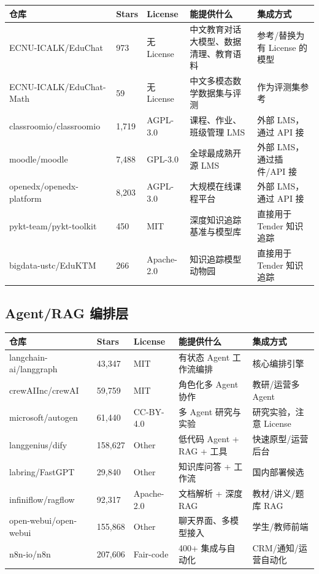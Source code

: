 \documentclass[UTF8,a4paper,11pt]{ctexart}
\begin{document}
\begin{center}
\begin{longtable}{@{}p{3.2cm}p{1.4cm}p{2.0cm}p{4.8cm}p{3.0cm}@{}}
\toprule
\textbf{仓库} & \textbf{Stars} & \textbf{License} & \textbf{能提供什么} & \textbf{集成方式} \\
\midrule
ECNU-ICALK/EduChat & 973 & 无 License & 中文教育对话大模型、数据清理、教育语料 & 参考/替换为有 License 的模型 \\
ECNU-ICALK/EduChat-Math & 59 & 无 License & 中文多模态数学数据集与评测 & 作为评测集参考 \\
classroomio/classroomio & 1{,}719 & AGPL-3.0 & 课程、作业、班级管理 LMS & 外部 LMS，通过 API 接 \\
moodle/moodle & 7{,}488 & GPL-3.0 & 全球最成熟开源 LMS & 外部 LMS，通过插件/API 接 \\
openedx/openedx-platform & 8{,}203 & AGPL-3.0 & 大规模在线课程平台 & 外部 LMS，通过 API 接 \\
pykt-team/pykt-toolkit & 450 & MIT & 深度知识追踪基准与模型库 & 直接用于 Tender 知识追踪 \\
bigdata-ustc/EduKTM & 266 & Apache-2.0 & 知识追踪模型动物园 & 直接用于 Tender 知识追踪 \\
\bottomrule
\end{longtable}
\end{center}

\subsection{Agent/RAG 编排层}

\begin{center}
\begin{longtable}{@{}p{3.2cm}p{1.6cm}p{2.2cm}p{4.4cm}p{3.0cm}@{}}
\toprule
\textbf{仓库} & \textbf{Stars} & \textbf{License} & \textbf{能提供什么} & \textbf{集成方式} \\
\midrule
langchain-ai/langgraph & 43{,}347 & MIT & 有状态 Agent 工作流编排 & 核心编排引擎 \\
crewAIInc/crewAI & 59{,}759 & MIT & 角色化多 Agent 协作 & 教研/运营多 Agent \\
microsoft/autogen & 61{,}440 & CC-BY-4.0 & 多 Agent 研究与实验 & 研究实验，注意 License \\
langgenius/dify & 158{,}627 & Other & 低代码 Agent + RAG + 工具 & 快速原型/运营后台 \\
labring/FastGPT & 29{,}840 & Other & 知识库问答 + 工作流 & 国内部署候选 \\
infiniflow/ragflow & 92{,}317 & Apache-2.0 & 文档解析 + 深度 RAG & 教材/讲义/题库 RAG \\
open-webui/open-webui & 155{,}868 & Other & 聊天界面、多模型接入 & 学生/教师前端 \\
n8n-io/n8n & 207{,}606 & Fair-code & 400+ 集成与自动化 & CRM/通知/运营自动化 \\
\bottomrule
\end{longtable}
\end{center}
\end{document}

